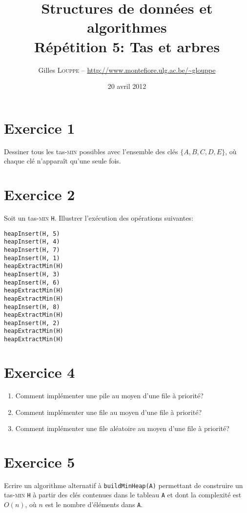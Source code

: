 \documentclass[a4paper,10pt]{article}
\title{
    \textbf{Structures de données et algorithmes}\\
    Répétition 5: Tas et arbres
}
\author{Gilles \textsc{Louppe} -- \url{http://www.montefiore.ulg.ac.be/~glouppe}}
\date{20 avril 2012}
\begin{document}
\maketitle

\section*{Exercice 1}

Dessiner tous les tas-\textsc{min} possibles avec l'ensemble des clés $\{A, B, C, D, E\}$, où chaque clé n'apparaît qu'une seule fois.

\section*{Exercice 2}

Soit un tas-\textsc{min} \texttt{H}. Illustrer l'exécution des opérations suivantes:

\begin{verbatim}
heapInsert(H, 5)
heapInsert(H, 4)
heapInsert(H, 7)
heapInsert(H, 1)
heapExtractMin(H)
heapInsert(H, 3)
heapInsert(H, 6)
heapExtractMin(H)
heapExtractMin(H)
heapInsert(H, 8)
heapExtractMin(H)
heapInsert(H, 2)
heapExtractMin(H)
heapExtractMin(H)
\end{verbatim}

\section*{Exercice 4}

\begin{enumerate}

\item Comment implémenter une pile au moyen d'une file à priorité?

\item Comment implémenter une file au moyen d'une file à priorité?

\item Comment implémenter une file aléatoire au moyen d'une file à priorité?

\end{enumerate}

\section*{Exercice 5}

Ecrire un algorithme alternatif à \texttt{buildMinHeap(A)} permettant de construire un tas-\textsc{min} \texttt{H} à partir des clés contenues dans le tableau \texttt{A} et dont la complexité est $O(n)$, où $n$ est le nombre d'éléments dans \texttt{A}.
\end{document}
